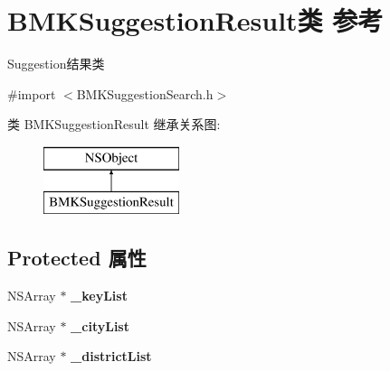 \hypertarget{interface_b_m_k_suggestion_result}{}\section{B\+M\+K\+Suggestion\+Result类 参考}
\label{interface_b_m_k_suggestion_result}


Suggestion结果类  




{\ttfamily \#import $<$B\+M\+K\+Suggestion\+Search.\+h$>$}

类 B\+M\+K\+Suggestion\+Result 继承关系图\+:\begin{figure}[H]
\begin{center}
\leavevmode
\includegraphics[height=2.000000cm]{interface_b_m_k_suggestion_result}
\end{center}
\end{figure}
\subsection*{Protected 属性}
\begin{DoxyCompactItemize}
\item 
\hypertarget{interface_b_m_k_suggestion_result_af33171b4e254408d71e6e6904ff361a1}{}N\+S\+Array $\ast$ {\bfseries \+\_\+key\+List}\label{interface_b_m_k_suggestion_result_af33171b4e254408d71e6e6904ff361a1}

\item 
\hypertarget{interface_b_m_k_suggestion_result_a6b3b6f1702dbb6acbe1d77e71d5b07b5}{}N\+S\+Array $\ast$ {\bfseries \+\_\+city\+List}\label{interface_b_m_k_suggestion_result_a6b3b6f1702dbb6acbe1d77e71d5b07b5}

\item 
\hypertarget{interface_b_m_k_suggestion_result_a0d6c54df02825f8166ff6c55c95b8770}{}N\+S\+Array $\ast$ {\bfseries \+\_\+district\+List}\label{interface_b_m_k_suggestion_result_a0d6c54df02825f8166ff6c55c95b8770}

\end{DoxyCompactItemize}

